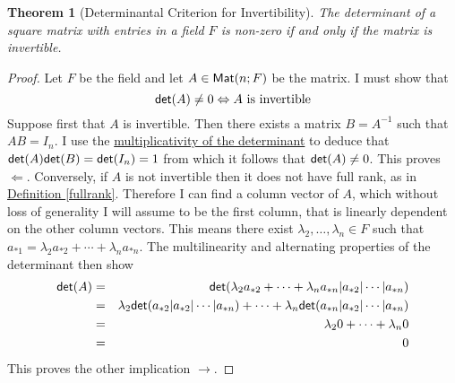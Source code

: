 \documentclass[11pt]{amsbook}
\newtheorem{theorem}{Theorem}[section]
\theoremstyle{definition}
\begin{document}
\begin{theorem}[Determinantal Criterion for Invertibility] \label{detinv} The determinant of a square matrix with entries in a field $F$ is non-zero if and only if the matrix is invertible.
\end{theorem}
\begin{proof}
Let $F$ be the field and let $A\in {\sf Mat}(n;F)$ be the matrix. I must show that $${\sf det}(A) \neq 0 \Leftrightarrow A \text{ is invertible}
$$
Suppose first that $A$ is invertible. Then there exists a matrix $B = A^{-1}$ such that $AB = I_n$. I use the \hyperref[detismult]{multiplicativity of the determinant} to deduce that ${\sf det}(A) {\sf det}(B) = {\sf det}(I_n) = 1$ from which it follows that ${\sf det}(A) \neq 0$. This proves $\Leftarrow$. Conversely, if $A$ is not invertible then it does not have full rank, as in \hyperref[fullrank]{Definition \ref{fullrank}}.  Therefore I can find a column vector of $A$, which without loss of generality I will assume to be the first column, that is linearly dependent on the other column vectors. This means there exist $\lambda_2, \ldots , \lambda_n \in F$ such that $a_{\ast 1} = \lambda_2 a_{\ast 2} + \cdots + \lambda_n a_{\ast n}.$ The multilinearity and alternating properties of the determinant then show \begin{eqnarray*} {\sf det}(A) & = & {\sf det}(\lambda_2 a_{\ast 2} + \cdots + \lambda_n a_{\ast n} | a_{\ast 2} | \cdots | a_{\ast n}) \\ & = & \lambda_2 {\sf det}(a_{\ast 2}| a_{\ast 2} | \cdots | a_{\ast n}) + \cdots + \lambda_n {\sf det}(a_{\ast n}|a_{\ast 2} | \cdots | a_{\ast n}) \\ & = & \lambda_2 0 + \cdots + \lambda_n 0 \\ & = & 0\end{eqnarray*} This proves the other implication $\to$.
\end{proof}
\end{document}
